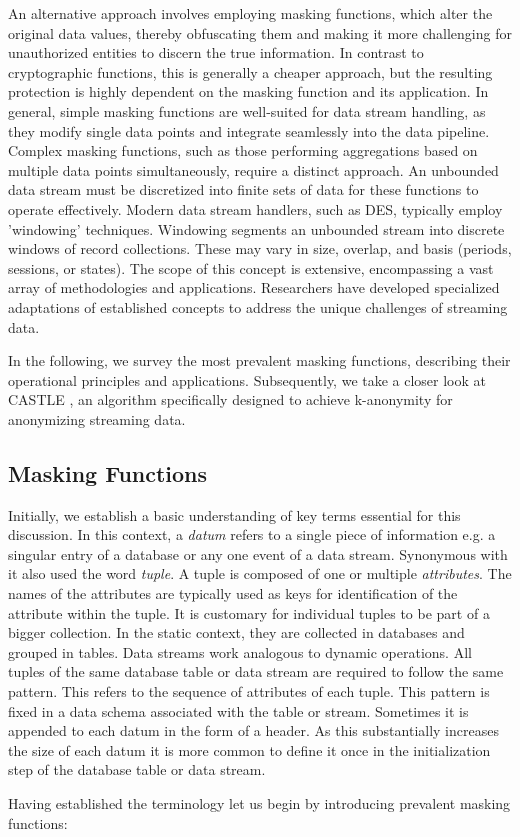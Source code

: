 An alternative approach involves employing masking functions, which alter the original data values, thereby obfuscating them and making it more challenging for unauthorized entities to discern the true information. In contrast to cryptographic functions, this is generally a cheaper approach, but the resulting protection is highly dependent on the masking function and its application. In general, simple masking functions are well-suited for data stream handling, as they modify single data points and integrate seamlessly into the data pipeline. Complex masking functions, such as those performing aggregations based on multiple data points simultaneously, require a distinct approach. An unbounded data stream must be discretized into finite sets of data for these functions to operate effectively. Modern data stream handlers, such as \ac{DES}, typically employ 'windowing' techniques. Windowing segments an unbounded stream into discrete windows of record collections. These may vary in size, overlap, and basis (periods, sessions, or states). The scope of this concept is extensive, encompassing a vast array of methodologies and applications. Researchers have developed specialized adaptations of established concepts to address the unique challenges of streaming data. \par
In the following, we survey the most prevalent masking functions, describing their operational principles and applications. Subsequently, we take a closer look at CASTLE \cite{Cao2008}, an algorithm specifically designed to achieve k-anonymity for anonymizing streaming data. 

\subsection{Masking Functions\label{sec:masking_functions}}
Initially, we establish a basic understanding of key terms essential for this discussion. In this context, a \textit{datum} refers to a single piece of information e.g. a singular entry of a database or any one event of a data stream. Synonymous with it also used the word \textit{tuple}. A tuple is composed of one or multiple \textit{attributes}. The names of the attributes are typically used as keys for identification of the attribute within the tuple. It is customary for individual tuples to be part of a bigger collection. In the static context, they are collected in databases and grouped in tables. Data streams work analogous to dynamic operations. All tuples of the same database table or data stream are required to follow the same pattern. This refers to the sequence of attributes of each tuple. This pattern is fixed in a data schema associated with the table or stream. Sometimes it is appended to each datum in the form of a header. As this substantially increases the size of each datum it is more common to define it once in the initialization step of the database table or data stream. \par
Having established the terminology let us begin by introducing prevalent masking functions:\par

